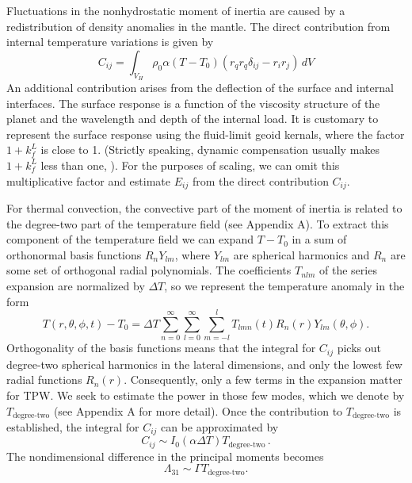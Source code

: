 \documentclass[preprint,12pt,authoryear]{elsarticle}
\begin{document}
Fluctuations in the nonhydrostatic moment of inertia are caused by a redistribution of density anomalies 
 in the mantle. The direct contribution from 
internal temperature variations is given by
\begin{equation}
C_{ij} = \int_{V_H} \rho_0 \alpha (T-T_0) \left( r_q r_q \delta_{ij} - r_i r_j \right) \,dV
\label{eq:temperature_fluctuations}
\end{equation}
An additional contribution arises from the deflection of the surface and internal interfaces. The surface response is a function of the viscosity structure of the planet and the wavelength and depth of the internal load. It is customary to represent the surface response using the fluid-limit geoid kernals,  where the factor
 $1+k^L_f$ is close to 1. 
(Strictly speaking, dynamic compensation usually makes $1 + k_f^L$ less than one, \citep[e.g.][]{richards1984geoid}). 
For the purposes of scaling, we can omit this multiplicative factor and estimate $E_{ij}$ from the direct contribution $C_{ij}$.

For thermal convection, the convective part of the moment of inertia is related to the degree-two part of the temperature field (see Appendix A).
To extract this component of the temperature field we can expand $T-T_0$ in a sum  of orthonormal basis functions $R_n Y_{lm}$, 
where $Y_{lm}$ are spherical harmonics and $R_n$ are some set of orthogonal radial polynomials. The coefficients
$T_{nlm}$ of the series expansion are normalized by $\Delta T$, so we represent the temperature anomaly in the form
\begin{equation} 
T( r , \theta, \phi, t ) - T_0 = \Delta T {\displaystyle \sum_{n=0}^\infty \sum_{l=0}^\infty \sum_{m=-l}^{l} } T_{lmn}(t) R_n(r) Y_{lm} (\theta , \phi).
\label{eq:T_series}
\end{equation}
Orthogonality of the basis functions means that the integral for $C_{ij}$ picks out degree-two 
spherical harmonics in the lateral dimensions, and only the lowest few radial functions $R_n(r)$.
Consequently, only a few terms in the expansion matter for TPW.
We seek to estimate the power in those few modes, which we denote by $T_{\text{degree-two}}$ (see Appendix A for more detail). Once the contribution to $T_{\text{degree-two}}$ is established, the integral for $C_{ij}$ can be approximated by
\begin{equation}
C_{ij} \sim I_0 (\alpha \Delta T) T_{\text{degree-two}} \, .
\end{equation}
The nondimensional difference in the principal moments becomes
\begin{equation}
\Lambda_{31} \sim \Gamma T_{\text{degree-two}}.
\end{equation}
\end{document}
